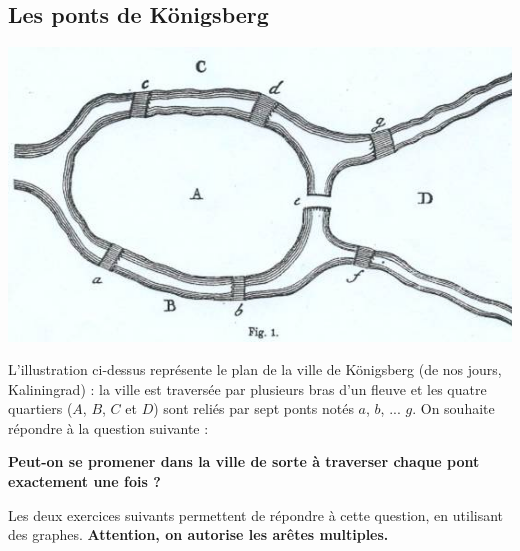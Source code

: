 


\subsection*{Les ponts de Königsberg}

\begin{center}
\includegraphics[scale=0.5]{img/koenigsberg.jpg}
\end{center}
L'illustration ci-dessus représente le plan de la ville de Königsberg (de nos jours, Kaliningrad) : la ville est traversée par plusieurs bras d'un fleuve et les quatre quartiers ($A$, $B$, $C$ et $D$) sont reliés par sept ponts notés $a$, $b$, ... $g$. On souhaite répondre à la question suivante : 
\begin{center}
\textbf{Peut-on se promener dans la ville de sorte à traverser chaque pont exactement une fois ?}
\end{center}
Les deux exercices suivants permettent de répondre à cette question, en utilisant des graphes. \textbf{Attention, on autorise les  arêtes multiples.}


